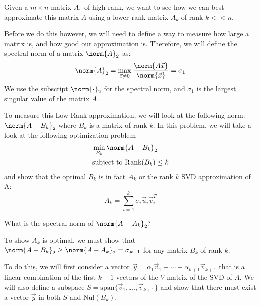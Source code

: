 

Given a $m \times n$ matrix $A,$ of high rank, we want to see how we can best approximate this matrix $A$ using a lower rank matrix $A_{k}$ of rank $k << n.$ 

Before we do this however, we will need to define a way to measure how large a matrix is, and how good our approximation is. Therefore, we will define the spectral norm of a matrix $\norm{A}_{2}$ as:
\begin{equation}
  \norm{A}_{2} = \max_{\vec{x} \neq 0} \frac{\norm{A \vec{x}}}{\norm{\vec{x}}} = \sigma_{1}
\end{equation}
We use the subscript $\norm{\cdot}_{2}$ for the spectral norm, and $\sigma_{1}$ is the largest singular value of the matrix $A.$

To measure this Low-Rank approximation, we will look at the following norm:
$\norm{A - B_{k}}_{2}$
where $B_{k}$ is a matrix of rank $k.$ In this problem, we will take a look at the following optimization problem
\begin{align*}
  &\min_{B_{k}}{\norm{A - B_{k}}_{2}} \\
  &\text{subject to} \ \text{Rank}(B_k) \leq k
\end{align*}
and show that the optimal $B_{k}$ is in fact $A_{k}$ or the rank $k$ SVD approximation of A:
\begin{equation}
  A_{k} = \sum\limits_{i = 1}^{k} \sigma_{i} \vec{u}_{i} \vec{v}_{i}^{T}
\end{equation}

\begin{enumerate}
  \qitem What is the spectral norm of $\norm{A - A_{k}}_{2}?$

\end{enumerate}

To show $A_{k}$ is optimal, we must show that $\norm{A - B_{k}}_{2} \geq \norm{A - A_{k}}_{2} = \sigma_{k+1}$ for any matrix $B_{k}$ of rank $k.$

To do this, we will first consider a vector $\vec{y} = \alpha_{1} \vec{v}_{1} + \cdots + \alpha_{k + 1} \vec{v}_{k + 1}$ that is a linear combination of the first $k + 1$ vectors of the $V$ matrix of the SVD of $A.$ 
We will also define a subspace $S = \text{span}\{ \vec{v}_{1}, \dotsc, \vec{v}_{k+1} \}$ and show that there must exist a vector $\vec{y}$ in both $S$ and $\text{Nul}(B_{k}).$

